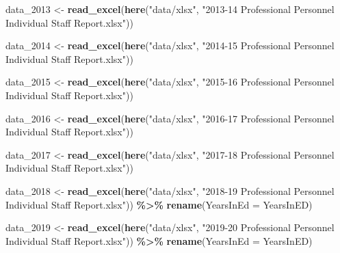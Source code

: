 \documentclass[
]{article}
\newenvironment{Shaded}{\begin{snugshade}}{\end{snugshade}}
\newcommand{\DataTypeTok}[1]{\textcolor[rgb]{0.13,0.29,0.53}{#1}}
\newcommand{\DecValTok}[1]{\textcolor[rgb]{0.00,0.00,0.81}{#1}}
\newcommand{\KeywordTok}[1]{\textcolor[rgb]{0.13,0.29,0.53}{\textbf{#1}}}
\newcommand{\NormalTok}[1]{#1}
\newcommand{\OperatorTok}[1]{\textcolor[rgb]{0.81,0.36,0.00}{\textbf{#1}}}
\newcommand{\StringTok}[1]{\textcolor[rgb]{0.31,0.60,0.02}{#1}}
\begin{document}
\begin{Shaded}
\begin{Highlighting}[]
\NormalTok{data\_}\DecValTok{2013}\NormalTok{ \textless{}{-}}\StringTok{ }\KeywordTok{read\_excel}\NormalTok{(}\KeywordTok{here}\NormalTok{(}\StringTok{"data/xlsx"}\NormalTok{, }\StringTok{"2013{-}14 Professional Personnel Individual Staff Report.xlsx"}\NormalTok{))}

\NormalTok{data\_}\DecValTok{2014}\NormalTok{ \textless{}{-}}\StringTok{ }\KeywordTok{read\_excel}\NormalTok{(}\KeywordTok{here}\NormalTok{(}\StringTok{"data/xlsx"}\NormalTok{, }\StringTok{"2014{-}15 Professional Personnel Individual Staff Report.xlsx"}\NormalTok{))}

\NormalTok{data\_}\DecValTok{2015}\NormalTok{ \textless{}{-}}\StringTok{ }\KeywordTok{read\_excel}\NormalTok{(}\KeywordTok{here}\NormalTok{(}\StringTok{"data/xlsx"}\NormalTok{, }\StringTok{"2015{-}16 Professional Personnel Individual Staff Report.xlsx"}\NormalTok{))}

\NormalTok{data\_}\DecValTok{2016}\NormalTok{ \textless{}{-}}\StringTok{ }\KeywordTok{read\_excel}\NormalTok{(}\KeywordTok{here}\NormalTok{(}\StringTok{"data/xlsx"}\NormalTok{, }\StringTok{"2016{-}17 Professional Personnel Individual Staff Report.xlsx"}\NormalTok{))}

\NormalTok{data\_}\DecValTok{2017}\NormalTok{ \textless{}{-}}\StringTok{ }\KeywordTok{read\_excel}\NormalTok{(}\KeywordTok{here}\NormalTok{(}\StringTok{"data/xlsx"}\NormalTok{, }\StringTok{"2017{-}18 Professional Personnel Individual Staff Report.xlsx"}\NormalTok{))}

\NormalTok{data\_}\DecValTok{2018}\NormalTok{ \textless{}{-}}\StringTok{ }\KeywordTok{read\_excel}\NormalTok{(}\KeywordTok{here}\NormalTok{(}\StringTok{"data/xlsx"}\NormalTok{, }\StringTok{"2018{-}19 Professional Personnel Individual Staff Report.xlsx"}\NormalTok{)) }\OperatorTok{\%\textgreater{}\%}\StringTok{ }\KeywordTok{rename}\NormalTok{(}\DataTypeTok{YearsInEd =}\NormalTok{ YearsInED)}

\NormalTok{data\_}\DecValTok{2019}\NormalTok{ \textless{}{-}}\StringTok{ }\KeywordTok{read\_excel}\NormalTok{(}\KeywordTok{here}\NormalTok{(}\StringTok{"data/xlsx"}\NormalTok{, }\StringTok{"2019{-}20 Professional Personnel Individual Staff Report.xlsx"}\NormalTok{)) }\OperatorTok{\%\textgreater{}\%}\StringTok{ }\KeywordTok{rename}\NormalTok{(}\DataTypeTok{YearsInEd =}\NormalTok{ YearsInED)}
\end{Highlighting}
\end{Shaded}
\end{document}
